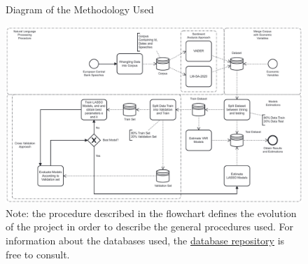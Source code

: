 \begin{landscape} %
\begin{figure}
    \centering
    \caption{Diagram of the Methodology Used}
    \includegraphics[width = \linewidth]{images/diagram2.pdf}
    \caption*{Note: the procedure described in the flowchart defines the evolution of the project in order to describe the general procedures used. For information about the databases used, the \href{https://github.com/gustavovital/Dissertation/tree/main/data}{database repository} is free to consult.}
    \label{fig:diagram}
\end{figure}
\end{landscape}






